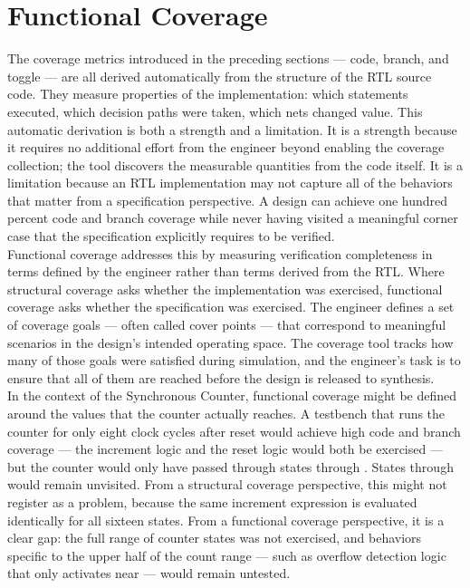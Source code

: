 \section{Functional Coverage}
\label{sec:functional-coverage}

The coverage metrics introduced in the preceding sections — code, branch, and toggle — are all derived automatically from the structure of the RTL source code. They measure properties of the implementation: which statements executed, which decision paths were taken, which nets changed value. This automatic derivation is both a strength and a limitation. It is a strength because it requires no additional effort from the engineer beyond enabling the coverage collection; the tool discovers the measurable quantities from the code itself. It is a limitation because an RTL implementation may not capture all of the behaviors that matter from a specification perspective. A design can achieve one hundred percent code and branch coverage while never having visited a meaningful corner case that the specification explicitly requires to be verified.\\

Functional coverage addresses this by measuring verification completeness in terms defined by the engineer rather than terms derived from the RTL. Where structural coverage asks whether the implementation was exercised, functional coverage asks whether the specification was exercised. The engineer defines a set of coverage goals — often called cover points — that correspond to meaningful scenarios in the design's intended operating space. The coverage tool tracks how many of those goals were satisfied during simulation, and the engineer's task is to ensure that all of them are reached before the design is released to synthesis.\\

In the context of the Synchronous Counter, functional coverage might be defined around the values that the counter actually reaches. A testbench that runs the counter for only eight clock cycles after reset would achieve high code and branch coverage — the increment logic and the reset logic would both be exercised — but the counter would only have passed through states  through . States  through  would remain unvisited. From a structural coverage perspective, this might not register as a problem, because the same increment expression is evaluated identically for all sixteen states. From a functional coverage perspective, it is a clear gap: the full range of counter states was not exercised, and behaviors specific to the upper half of the count range — such as overflow detection logic that only activates near  — would remain untested.\\

